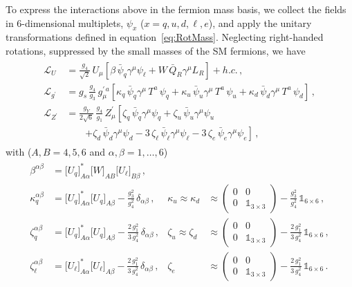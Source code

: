 To express the interactions above in the fermion mass basis, we collect the fields in 6-dimensional multiplets, $\psi_x$ ($x=q,u,d,\ell,e$), and apply the unitary transformations defined in equation~\ref{eq:RotMass}. Neglecting right-handed rotations, suppressed by the small masses of the SM fermions, we have
\begin{align}
\begin{aligned}
\mathcal{L}_U&=\frac{g_4}{\sqrt{2}}\,U_\mu\left[\beta\,\bar \psi_q\gamma^\mu \psi_\ell+W\,\bar Q_R\gamma^\mu L_R\right]+h.c.\,,\\
\mathcal{L}_{g^\prime}&= g_s\,\frac{g_4}{g_3}\,g^{\prime\,a}_\mu\left[\kappa_q\,\bar \psi_q\gamma^\mu\,T^a\, \psi_q+\kappa_u\,\bar \psi_u\gamma^\mu\,T^a\, \psi_u+\kappa_d\,\bar \psi_d\gamma^\mu\,T^a\, \psi_d\right]\,,\\
\mathcal{L}_{Z^\prime}&=\frac{g_Y}{2\sqrt{6}}\,\frac{g_4}{g_1}\,Z_\mu^\prime\left[\zeta_q\,\bar \psi_q\gamma^\mu \psi_q+\zeta_u\,\bar \psi_u\gamma^\mu \psi_u
\right.
\\&\qquad
\left.
+\zeta_d\,\bar \psi_d\gamma^\mu \psi_d-3\,\zeta_\ell\,\bar \psi_\ell\gamma^\mu \psi_\ell-3\,\zeta_e\,\bar \psi_e\gamma^\mu \psi_e\right]\,,\label{eq:LLmbS}
\end{aligned}
\end{align}
with ($A,B=4,5,6$ and $\alpha,\beta=1,\dots,6$)
\begin{align}
\begin{aligned}
\beta^{\alpha\beta}&= \big[U_q\big]^*_{A\alpha}\big[W\big]_{AB} \big[U_\ell\big]_{B\beta}\,,\\
\kappa_q^{\alpha\beta}&= \big[U_q\big]^*_{A\alpha} \big[U_q\big]_{A\beta}-\frac{g_3^2}{g_4^2}\,\delta_{\alpha\beta}\,,&\kappa_u\approx\kappa_d&\approx
\begin{pmatrix}
0 & 0\\
0 & \mathbb{1}_{3\times3}
\end{pmatrix}
-\frac{g_3^2}{g_4^2}\,\mathbb{1}_{6\times6}\,,\\
\zeta_q^{\alpha\beta}&= \big[U_q\big]^*_{A\alpha} \big[U_q\big]_{A\beta}-\frac{2\,g_1^2}{3\,g_4^2}\,\delta_{\alpha\beta}\,,& \zeta_u\approx\zeta_d&\approx
\begin{pmatrix}
0 & 0\\
0 & \mathbb{1}_{3\times3}
\end{pmatrix}
-\frac{2\,g_1^2}{3\,g_4^2}\,\mathbb{1}_{6\times6}\,,\\
\zeta_\ell^{\alpha\beta}&= \big[U_\ell\big]^*_{A\alpha} \big[U_\ell\big]_{A\beta}-\frac{2\,g_1^2}{3\,g_4^2}\,\delta_{\alpha\beta}\,,& \zeta_e&\approx
\begin{pmatrix}
0 & 0\\
0 & \mathbb{1}_{3\times3}
\end{pmatrix}
-\frac{2\,g_1^2}{3\,g_4^2}\,\mathbb{1}_{6\times6}\,.
\end{aligned}
\end{align}
